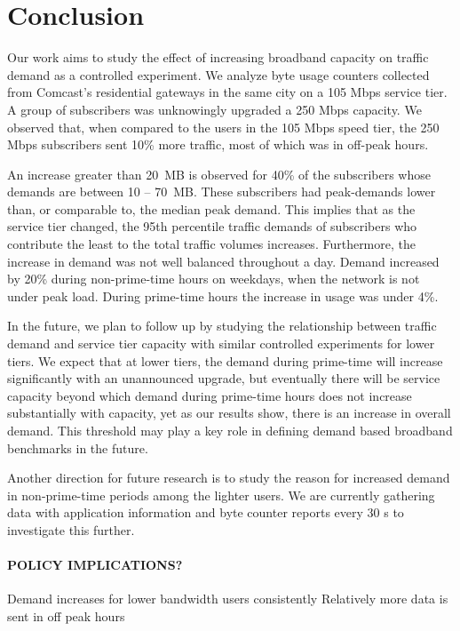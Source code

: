 \section{Conclusion}\label{sec:conclusion}

Our work aims to study the effect of increasing broadband capacity on traffic
demand as a controlled experiment. We analyze byte usage counters collected
from Comcast's residential gateways in the same city on a 105 Mbps service
tier. A group of subscribers was unknowingly upgraded a 250 Mbps capacity.
We observed that, when compared to the users in the 105 Mbps speed tier,
the 250 Mbps subscribers sent 10\% more traffic, most of which was in 
off-peak hours.

An increase greater than 20~MB is observed for 40\% of the 
subscribers whose demands are between 10 -- 70~MB. These subscribers
had peak-demands lower than, or comparable to, the median peak demand.
This implies that as the service tier changed, the 95th percentile 
traffic demands of subscribers who contribute the least to the total
traffic volumes increases. Furthermore, the increase in demand was not well
balanced throughout a day. Demand increased by 20\% during non-prime-time
hours on weekdays, when the network is not under peak load. During prime-time
hours the increase in usage was under 4\%.

In the future, we plan to follow up by studying the relationship between
traffic demand and service tier
capacity with similar controlled experiments for lower tiers. 
We expect that at lower tiers, the demand during prime-time will increase 
significantly with an unannounced upgrade, but eventually there will be
service capacity beyond which demand during prime-time hours does not
increase substantially with capacity, yet as our results show, there is an 
increase in overall demand. This threshold may play a key role in defining
demand based broadband benchmarks in the future.

Another direction for future research is to study the reason for increased 
demand in non-prime-time periods among the lighter users. We are currently 
gathering data with application information and byte counter reports every 30 s 
to investigate this further.

\paragraph{POLICY IMPLICATIONS?}

Demand increases for lower bandwidth users consistently
Relatively more data is sent in off peak hours 

